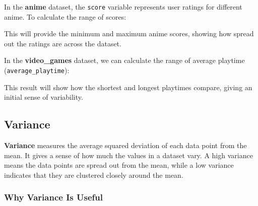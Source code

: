 \documentclass[
]{book}
\newenvironment{Shaded}{\begin{snugshade}}{\end{snugshade}}
\newcommand{\AttributeTok}[1]{\textcolor[rgb]{0.13,0.29,0.53}{#1}}
\newcommand{\CommentTok}[1]{\textcolor[rgb]{0.56,0.35,0.01}{\textit{#1}}}
\newcommand{\ConstantTok}[1]{\textcolor[rgb]{0.56,0.35,0.01}{#1}}
\newcommand{\FunctionTok}[1]{\textcolor[rgb]{0.13,0.29,0.53}{\textbf{#1}}}
\newcommand{\NormalTok}[1]{#1}
\newcommand{\OtherTok}[1]{\textcolor[rgb]{0.56,0.35,0.01}{#1}}
\newcommand{\SpecialCharTok}[1]{\textcolor[rgb]{0.81,0.36,0.00}{\textbf{#1}}}
\begin{document}
In the \textbf{anime} dataset, the \texttt{score} variable represents user ratings for different anime. To calculate the range of scores:

\begin{Shaded}
\end{Shaded}

This will provide the minimum and maximum anime scores, showing how spread out the ratings are across the dataset.

In the \textbf{video\_games} dataset, we can calculate the range of average playtime (\texttt{average\_playtime}):

\begin{Shaded}
\end{Shaded}

This result will show how the shortest and longest playtimes compare, giving an initial sense of variability.

\subsection*{Variance}\label{variance}

\textbf{Variance} measures the average squared deviation of each data point from the mean. It gives a sense of how much the values in a dataset vary. A high variance means the data points are spread out from the mean, while a low variance indicates that they are clustered closely around the mean.

\subsubsection*{Why Variance Is Useful}\label{why-variance-is-useful}
\end{document}
